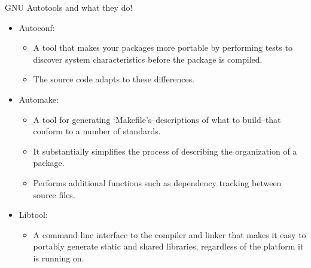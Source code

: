 \documentclass{beamer}
\begin{document}
\begin{frame}{GNU Autotools and what they do!}
\begin{itemize}
	\item Autoconf:\pause
	\begin{itemize}
		\item A tool that makes your packages more portable by performing tests to discover system characteristics before the package is compiled. \pause
		\item The source code adapts to these differences. \pause
	\end{itemize}
	\item Automake:\pause
	\begin{itemize}
		\item A tool for generating `Makefile's--descriptions of what to build--that conform to a number of standards. \pause	 
		\item It substantially simplifies the process of describing the organization of a package. \pause
		\item Performs additional functions such as dependency tracking between source files. \pause
	\end{itemize}
	\item Libtool:\pause
	\begin{itemize}
		\item A command line interface to the compiler and linker that makes it easy to portably generate static and shared libraries, regardless of the platform it is running on.
	\end{itemize}
\end{itemize}
\end{frame}
\end{document}
